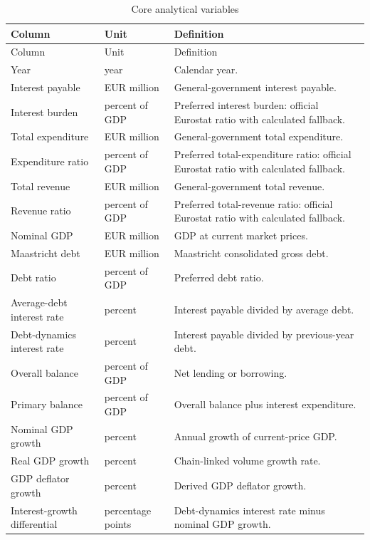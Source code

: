 \documentclass[11pt,a4paper]{article}
\begin{document}
\scriptsize
\begingroup
{}
\begin{longtable}{L{0.28\textwidth}L{0.18\textwidth}L{0.46\textwidth}}
\caption{Core analytical variables}\\
\toprule
Column & Unit & Definition \\
\midrule
\endfirsthead
\toprule
Column & Unit & Definition \\
\midrule
\endhead
Year & year & Calendar year. \\
Interest payable & EUR million & General-government interest payable. \\
Interest burden & percent of GDP & Preferred interest burden: official Eurostat ratio with calculated fallback. \\
Total expenditure & EUR million & General-government total expenditure. \\
Expenditure ratio & percent of GDP & Preferred total-expenditure ratio: official Eurostat ratio with calculated fallback. \\
Total revenue & EUR million & General-government total revenue. \\
Revenue ratio & percent of GDP & Preferred total-revenue ratio: official Eurostat ratio with calculated fallback. \\
Nominal GDP & EUR million & GDP at current market prices. \\
Maastricht debt & EUR million & Maastricht consolidated gross debt. \\
Debt ratio & percent of GDP & Preferred debt ratio. \\
Average-debt interest rate & percent & Interest payable divided by average debt. \\
Debt-dynamics interest rate & percent & Interest payable divided by previous-year debt. \\
Overall balance & percent of GDP & Net lending or borrowing. \\
Primary balance & percent of GDP & Overall balance plus interest expenditure. \\
Nominal GDP growth & percent & Annual growth of current-price GDP. \\
Real GDP growth & percent & Chain-linked volume growth rate. \\
GDP deflator growth & percent & Derived GDP deflator growth. \\
Interest-growth differential & percentage points & Debt-dynamics interest rate minus nominal GDP growth. \\

\end{longtable}
\end{document}
